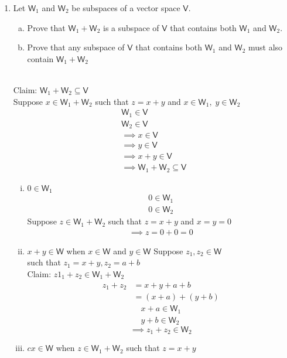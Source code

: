 \documentclass[letterpaper,12pt]{article}
\newcommand{\?}{\stackrel{?}{=}}
\begin{document}
\begin{spacing}{1.5}
\begin{enumerate}
\newpage{}
\setcounter{enumi}{22}
\item Let $\mathsf{W}_1$ and $\mathsf{W}_2$ be subspaces of a vector
  space $\mathsf{V}$.
\begin{enumerate}[(a)]
\item Prove that $\mathsf{W}_1 + \mathsf{W}_2$ is a subspace of
  $\mathsf{V}$ that contains both $\mathsf{W}_1$ and $\mathsf{W}_2$.
\item Prove that any subspace of $\mathsf{V}$ that contains both
  $\mathsf{W}_1$ and $\mathsf{W}_2$ must also contain $\mathsf{W}_1 +
  \mathsf{W}_2$ 
\end{enumerate}
\\
Claim: $\mathsf{W}_1 + \mathsf{W}_2 \subseteq \mathsf{V}$
\\
Suppose $x \in \mathsf{W}_1 + \mathsf{W}_2$ such that $z = x + y $ and
$x \in \mathsf{W}_1, \; y  \in \mathsf{W}_2$
\begin{align}
\mathsf{W}_1 \in \mathsf{V}\\
\mathsf{W}_2 \in \mathsf{V}\\
\implies x \in \mathsf{V} \\
 \implies y \in \mathsf{V}\\
\implies x + y \in \mathsf{V}\\
\implies \mathsf{W}_1 + \mathsf{W}_2 \subseteq \mathsf{V}
\end{align}
\begin{enumerate}[(i)]
\item $0 \in \mathsf{W}_1$
\begin{align}
0 \in \mathsf{W}_1\\
0 \in \mathsf{W}_2
\end{align}
Suppose $z \in \mathsf{W}_1 + \mathsf{W}_2$ such that $z = x+y$ and
$x=y=0$ 
\begin{align}
\implies z = 0 + 0 =0
\end{align}
\item $x + y \in \mathsf{W}$ when $ x \in \mathsf{W}$ and $y \in
  \mathsf{W}$
Suppose $z_1,z_2 \in \mathsf{W}$ \\such that $z_1 = x +  y,z_2  =  a +
b$\\
Claim: $z1_1 + z_2 \in \mathsf{W}_1  + \mathsf{W}_2$
\begin{align}
z_1 + z_2 &= x+ y + a+b\\
&= \left(x+a\right) + \left(y+b\right)
\end{align}
\begin{align}
x+a\in \mathsf{W}_1\\
y+b\in \mathsf{W}_2
\end{align}
\begin{equation}
\implies z_1 + z_2 \in \mathsf{W}_2
\end{equation}
\item $cx \in \mathsf{W}$ when $z \in \mathsf{W}_1 + \mathsf{W}_2$
  such that $z=x+y$


\end{enumerate}
\end{enumerate}
\end{spacing}
\end{document}
